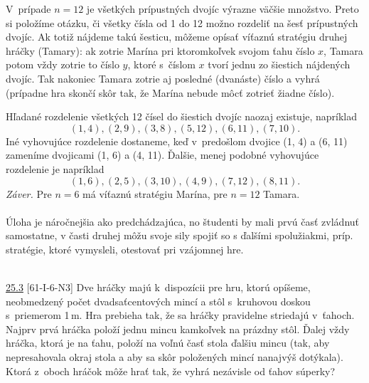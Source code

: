 V~prípade $n = 12$ je všetkých prípustných dvojíc výrazne väčšie množstvo. Preto si položíme otázku, či všetky čísla od 1 do 12 možno rozdeliť na šesť prípustných dvojíc. Ak totiž nájdeme takú šesticu, môžeme opísať víťaznú stratégiu druhej hráčky (Tamary): ak zotrie Marína pri ktoromkoľvek svojom ťahu číslo $x$, Tamara potom vždy zotrie to číslo $y$, ktoré s~číslom $x$ tvorí jednu zo šiestich nájdených dvojíc. Tak nakoniec Tamara zotrie aj posledné (dvanáste) číslo a vyhrá (prípadne hra skončí skôr tak, že Marína nebude môcť zotrieť žiadne číslo).

Hľadané rozdelenie všetkých 12 čísel do šiestich dvojíc naozaj existuje, napríklad
$$(1, 4), (2, 9), (3, 8), (5, 12), (6, 11), (7, 10).$$
Iné vyhovujúce rozdelenie dostaneme, keď v~predošlom dvojice (1, 4) a (6, 11) zameníme dvojicami (1, 6) a (4, 11). Ďalšie, menej podobné vyhovujúce rozdelenie je napríklad
$$(1, 6), (2, 5), (3, 10), (4, 9), (7, 12), (8, 11).$$
\textit{Záver.} Pre $n = 6$ má víťaznú stratégiu Marína, pre $n = 12$ Tamara.\\
\\
\kom Úloha je náročnejšia ako predchádzajúca, no študenti by mali prvú časť zvládnuť samostatne, v časti druhej môžu svoje sily spojiť so s ďalšími spolužiakmi, príp. stratégie, ktoré vymysleli, otestovať pri vzájomnej hre.\\
\\
\begin{tcolorbox}[breakable,notitle,boxrule=0pt,colback=light-gray,colframe=light-gray]\ul{25.3} [61-I-6-N3] Dve hráčky majú k~dispozícii pre hru, ktorú opíšeme, neobmedzený počet dvadsaťcentových mincí a stôl s~kruhovou doskou s~priemerom 1\,m. Hra prebieha tak, že sa hráčky pravidelne striedajú v~ťahoch. Najprv prvá hráčka položí jednu mincu kamkoľvek na prázdny stôl. Ďalej vždy hráčka, ktorá je na ťahu, položí na voľnú časť stola ďalšiu mincu (tak, aby nepresahovala okraj stola a aby sa skôr položených mincí nanajvýš dotýkala). Ktorá z~oboch hráčok môže hrať tak, že vyhrá nezávisle od ťahov súperky?

\end{tcolorbox}

